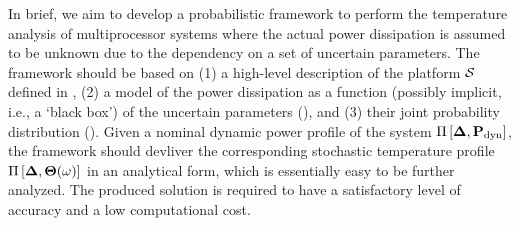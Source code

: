 In brief, we aim to develop a probabilistic framework to perform the temperature analysis of multiprocessor systems where the actual power dissipation is assumed to be unknown due to the dependency on a set of uncertain parameters. The framework should be based on (1) a high-level description of the platform $\mathcal{S}$ defined in , (2) a model of the power dissipation as a function (possibly implicit, i.e., a `black box') of the uncertain parameters (), and (3) their joint probability distribution (). Given a nominal dynamic power profile of the system $\prof{\mP_\dyn}$, the framework should devliver the corresponding stochastic temperature profile $\Pi\left[\boldsymbol{\Delta}, {\boldsymbol\Theta}(\omega)\right]$ in an analytical form, which is essentially easy to be further analyzed. The produced solution is required to have a satisfactory level of accuracy and a low computational cost.
